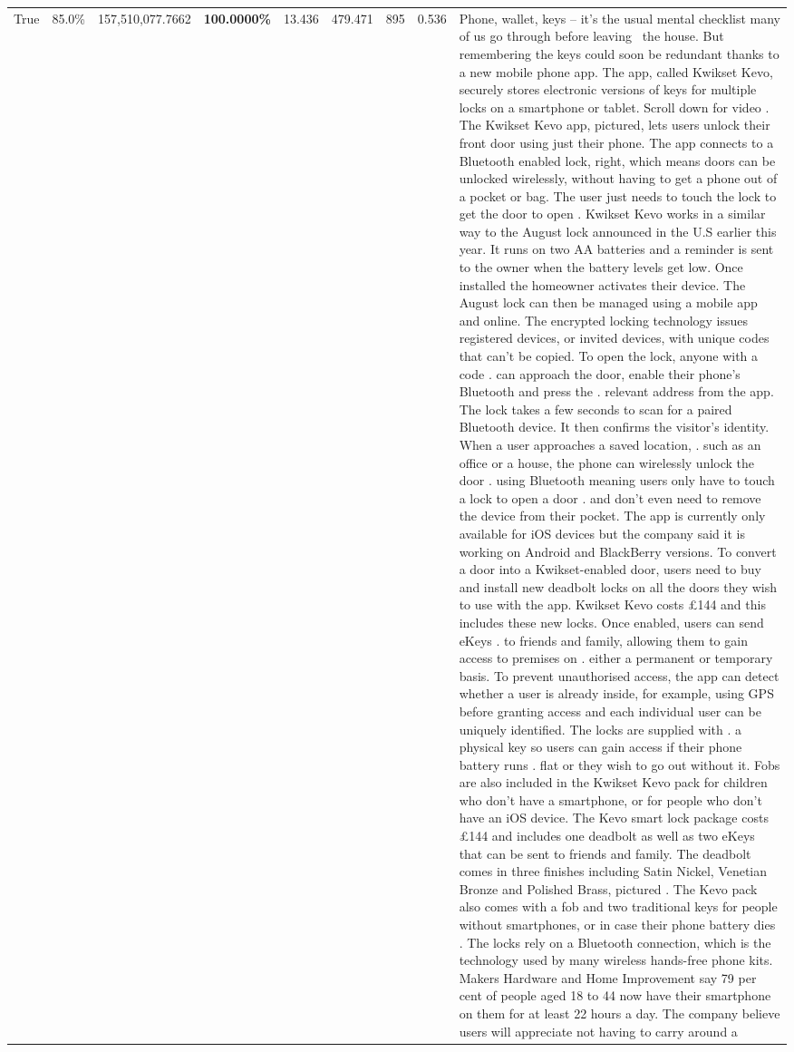 \begin{table}[H]
\begin{tabular}{lllrlllll}
True & 85.0\% & 157,510,077.7662 & \bfseries \color{red} 100.0000\% & 13.436 & 479.471 & 895 & 0.536 & Phone, wallet, keys – it’s the usual mental checklist many of us go through before leaving  the house. But remembering the keys could soon be redundant thanks to a new mobile phone app. The app, called Kwikset Kevo, securely stores electronic versions of keys for multiple locks on a smartphone or tablet. Scroll down for video . The Kwikset Kevo app, pictured, lets users unlock their front door using just their phone. The app connects to a Bluetooth enabled lock, right, which means doors can be unlocked wirelessly, without having to get a phone out of a pocket or bag. The user just needs to touch the lock to get the door to open . Kwikset Kevo works in a similar way to the August lock announced in the U.S earlier this year. It runs on two AA batteries and a reminder is sent to the owner when the battery levels get low. Once installed the homeowner activates their device. The August lock can then be managed using a mobile app and online. The encrypted locking technology issues registered devices, or invited devices, with unique codes that can't be copied. To open the lock, anyone with a code . can approach the door, enable their phone's Bluetooth and press the . relevant address from the app. The lock takes a few seconds to scan for a paired Bluetooth device. It then confirms the visitor's identity. When a user approaches a saved location, . such as an office or a house, the phone can wirelessly unlock the door . using Bluetooth meaning users only have to touch a lock to open a door . and don't even need to remove the device from their pocket. The app is currently only available for iOS devices but the company said it is working on Android and BlackBerry versions. To convert a door into a Kwikset-enabled door, users need to buy and install new deadbolt locks on all the doors they wish to use with the app. Kwikset Kevo costs £144 and this includes these new locks. Once enabled, users can send eKeys . to friends and family, allowing them to gain access to premises on . either a permanent or temporary basis. To prevent unauthorised access, the app can detect whether a user is already inside, for example, using GPS before granting access and each individual user can be uniquely identified. The locks are supplied with . a physical key so users can gain access if their phone battery runs . flat or they wish to go out without it. Fobs are also included in the Kwikset Kevo pack for children who don't have a smartphone, or for people who don't have an iOS device. The Kevo smart lock package costs £144 and includes one deadbolt as well as two eKeys that can be sent to friends and family. The deadbolt comes in three finishes including Satin Nickel, Venetian Bronze and Polished Brass, pictured . The Kevo pack also comes with a fob and two traditional keys for people without smartphones, or in case their phone battery dies . The locks rely on a Bluetooth connection, which is the technology used by many wireless hands-free phone kits. Makers Hardware and Home Improvement say 79 per cent of people aged 18 to 44 now have their smartphone on them for at least 22 hours a day. The company believe users will appreciate not having to carry around a 
\end{tabular}
\end{table}
